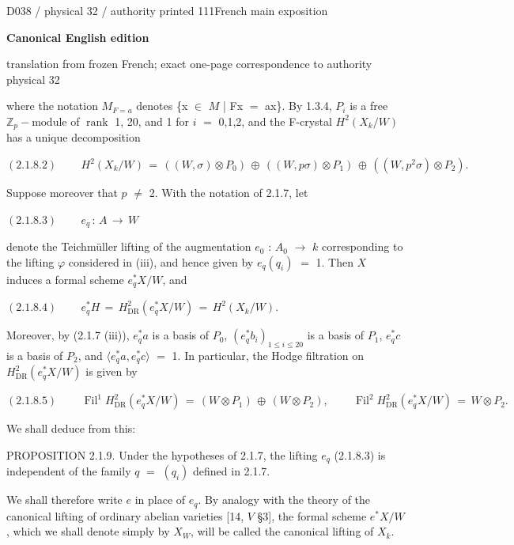 \documentclass[9pt]{article}
\newcommand{\CanonText}[1]{\par{\fontsize{8.0}{9.35}\selectfont\RaggedRight #1\par}\vspace{2.2pt}}
\newcommand{\CanonDisplay}[1]{\par\vspace{1.2pt}\begin{center}{\fontsize{7.2}{8.4}\selectfont\(\displaystyle #1\)}\end{center}\vspace{1.2pt}}
\newcommand{\LayerTitle}{Canonical English edition}
\begin{document}
\noindent\begin{minipage}[t][\dimexpr\textheight-5pt\relax][t]{\textwidth}
{\sffamily\fontsize{7.3}{8.2}\selectfont\color{Quiet} D038 / physical 32 / authority printed 111\hfill French main exposition}
\par{}\vspace{4.5pt}
{\sffamily\fontsize{10.4}{11.6}\selectfont\bfseries\color{Accent} \LayerTitle}
\par{\sffamily\fontsize{6.7}{7.7}\selectfont\color{Quiet} translation from frozen French; exact one-page correspondence to authority physical 32}
\vspace{5pt}
\CanonText{where the notation \(M_{F=a}\) denotes \{x \(\in{}\) \(M\) | Fx \(=\) ax\}. By 1.3.4, \(P_{i}\) is a free \(\mathbb{Z}_{p}-\text{module}\) of \(\operatorname{rank}\) 1, 20, and 1 for \(i\) \(=\) 0,1,2, and the F-crystal \(H^{2}(X_{k}/W)\) has a unique decomposition}
\CanonDisplay{(2.1.8.2)\qquad\,H^{2}(X_{k}/W)\,=\,((W,\sigma{})\otimes{}P_{0})\,\oplus{}\,((W,p\sigma{})\otimes{}P_{1})\,\oplus{}\,((W,p^{2}\sigma{})\otimes{}P_{2}).}
\CanonText{Suppose moreover that \(p\) \(\neq{}\) 2. With the notation of 2.1.7, let}
\CanonDisplay{(2.1.8.3)\qquad\,e_{q}\,:\,A\,\to{}\,W}
\CanonText{denote the Teichmüller lifting of the augmentation \(e_{0}\) : \(A_{0}\) \(\to{}\) \(k\) corresponding to the lifting \(\varphi{}\) considered in (iii), and hence given by \(e_{q}(q_{i})\) \(=\) 1. Then \(X\) induces a formal scheme \(e_{q}^{*}X/W\), and}
\CanonDisplay{(2.1.8.4)\qquad\,e_{q}^{*}H\,=\,H^{2}_{\mathrm{DR}}(e_{q}^{*}X/W)\,=\,H^{2}(X_{k}/W).}
\CanonText{Moreover, by (2.1.7 (iii)), \(e_{q}^{*}a\) is a basis of \(P_{0}\), \((e_{q}^{*}b_{i})_{1\leq{}i\leq{}20}\) is a basis of \(P_{1}\), \(e_{q}^{*}c\) is a basis of \(P_{2}\), and \(\langle{}e_{q}^{*}a,e_{q}^{*}c\rangle{}\) \(=\) 1. In particular, the Hodge filtration on \(H^{2}_{\mathrm{DR}}(e_{q}^{*}X/W)\) is given by}
\CanonDisplay{(2.1.8.5)\qquad\,\operatorname{Fil}^{1}H^{2}_{\mathrm{DR}}(e_{q}^{*}X/W)\,=\,(W\otimes{}P_{1})\,\oplus{}\,(W\otimes{}P_{2}),\qquad\,\operatorname{Fil}^{2}H^{2}_{\mathrm{DR}}(e_{q}^{*}X/W)\,=\,W\otimes{}P_{2}.}
\CanonText{We shall deduce from this:}
\CanonText{PROPOSITION 2.1.9. Under the hypotheses of 2.1.7, the lifting \(e_{q}\) (2.1.8.3) is independent of the family \(q\) \(=\) \((q_{i})\) defined in 2.1.7.}
\CanonText{We shall therefore write \(e\) in place of \(e_{q}\). By analogy with the theory of the canonical lifting of ordinary abelian varieties [14, \(V\) §3], the formal scheme \(e^{*}X/W\), which we shall denote simply by \(X_{W}\), will be called the canonical lifting of \(X_{k}\).}

\end{minipage}
\end{document}
